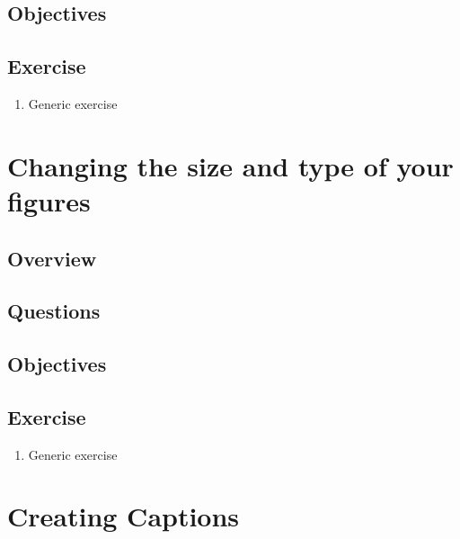 \documentclass[]{article}
\providecommand{\tightlist}{%
  \setlength{\itemsep}{0pt}\setlength{\parskip}{0pt}}
\begin{document}
\hypertarget{objectives-4}{%
\subsection{Objectives}\label{objectives-4}}

\hypertarget{exercise-3}{%
\subsection{Exercise}\label{exercise-3}}

\begin{enumerate}
\def\labelenumi{\arabic{enumi}.}
\tightlist
\item
  Generic exercise
\end{enumerate}

\hypertarget{changing-the-size-and-type-of-your-figures}{%
\section{Changing the size and type of your
figures}\label{changing-the-size-and-type-of-your-figures}}

\hypertarget{overview-6}{%
\subsection{Overview}\label{overview-6}}

\hypertarget{questions-6}{%
\subsection{Questions}\label{questions-6}}

\hypertarget{objectives-5}{%
\subsection{Objectives}\label{objectives-5}}

\hypertarget{exercise-4}{%
\subsection{Exercise}\label{exercise-4}}

\begin{enumerate}
\def\labelenumi{\arabic{enumi}.}
\tightlist
\item
  Generic exercise
\end{enumerate}

\hypertarget{creating-captions}{%
\section{Creating Captions}\label{creating-captions}}
\end{document}
